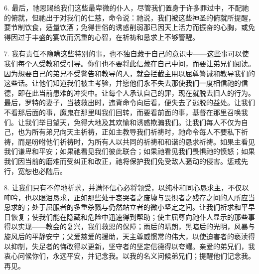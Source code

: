 6. 最后，祂恩赐给我们这些最卑微的仆人，尽管我们置身于许多罪过中，不配祂的俯就，但祂出于对我们的仁慈，命令说：祂说，我们被这些神圣的俯就所提醒，要节制饮食，适量饮酒；免得世俗的诱惑削弱那已因天上活力而振奋的心胸，或免得因过于丰盛的宴饮而沉重的心智，在祈祷和恳求上不够警醒。\par

7. 我有责任不隐瞒这些特别的事，也不独自藏于自己的意识中——这些事可以使我们每个人受教和受引导。你们也不要将此信藏在自己中间，而要让弟兄们阅读。因为想要自己的弟兄不受警告和教导的人，就会拦截主用以屈尊警诫和教导我们的这些话。让他们知道我们被主考验，并愿他们永不失去那使我们一度相信祂的信德，即在此当前患难的冲突中。让每个人承认自己的罪，现在就脱去旧人的行为。最后，罗特的妻子，当被救出时，违背命令向后看，便失去了逃脱的益处。让我们不看那后面的事，魔鬼在那里叫我们回转，而要看前面的事，基督在那里召唤我们。让我们举目望天，免得大地及其欢愉和诱惑欺骗我们。让我们每人不仅为自己，也为所有弟兄向天主祈祷，正如主教导我们祈祷时，祂命令每人不要私下祈祷，而是吩咐他们祈祷时，为所有人以共同的祈祷和和谐的恳求祈祷。如果主看见我们谦卑和平安；如果祂看见我们彼此联合；如果祂看见我们畏惧祂的愤怒；如果我们因当前的磨难而受纠正和改正，祂将保护我们免受敌人骚动的侵害。惩戒先行，宽恕也必随后。\par

8. 让我们只有不停地祈求，并满怀信心必将领受，以纯朴和同心恳求主，不仅以呻吟，也以眼泪恳求，正如那些处于哀哭者之废墟与畏惧者之残存之间的人所应当恳求的；处于屈服者的多重杀戮与仍然站立者的微小坚定之间。让我们祈求和平早日恢复；使我们能在隐藏和危险中迅速得到帮助；使主屈尊向祂仆人显示的那些事得以实现——教会的复兴，我们救恩的保障；雨后的晴朗，黑暗后的光明，风暴与旋风后的平静安宁；父爱慈爱的援助，天主尊威惯常的伟大，以使迫害者的亵渎得以抑制，失足者的悔改得以更新，坚守者的坚定信德得以夸耀。亲爱的弟兄们，我衷心问候你们，永远平安，并记念我。以我的名义问候弟兄们；提醒他们记念我。再见。\par



\section{}


